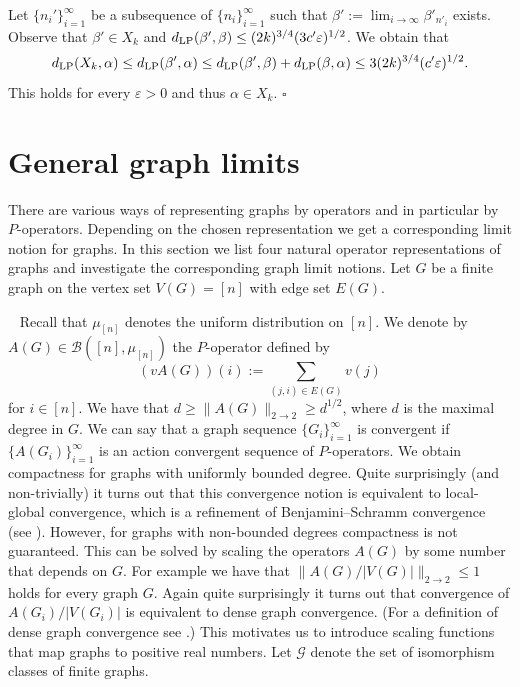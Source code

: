 \documentclass[a4wider]{amsart}
\theoremstyle{definitionbreak}\newtheorem{D}[theorem]{Definition}
\theoremstyle{definitionbreak}\newtheorem*{D*}{Definition}
\begin{document}
Let $\{n_i'\}_{i=1}^\infty$ be a subsequence of $\{n_i\}_{i=1}^\infty$ such that $\beta':=\lim_{i\to\infty}\beta'_{n'_i}$ exists. Observe that $\beta'\in X_k$ and $d_{\rm LP}(\beta',\beta)\leq (2k)^{3/4}(3c'\varepsilon)^{1/2}$. We obtain that $$d_{\rm LP}(X_k,\alpha)\leq d_{\rm LP}(\beta',\alpha)\leq d_{\rm LP}(\beta',\beta)+d_{\rm LP}(\beta,\alpha)\leq 3(2k)^{3/4}(c'\varepsilon)^{1/2}.$$ This holds for every $\varepsilon>0$ and thus $\alpha\in X_k$. \hfill  $\square$






\section{General graph limits}\label{chapgenlim}

\label{general}

There are various ways of representing graphs by operators and in particular by $P$-operators. Depending on the chosen representation we get a corresponding limit notion for graphs. In this section we list four natural operator representations of graphs and investigate the corresponding graph limit notions. Let $G$ be a finite graph on the vertex set $V(G)=[n]$ with edge set $E(G)$. 

~ Recall that $\mu_{[n]}$ denotes the uniform distribution on $[n]$.  We denote by $A(G)\in\mathcal{B}([n],\mu_{[n]})$ the $P$-operator defined by 
$$(vA(G))(i):=\sum_{(j,i)\in E(G)} v(j)$$ for $i\in [n]$. We have that $d\geq\|A(G)\|_{2\to 2}\geq d^{1/2}$, where $d$ is the maximal degree in $G$. We can say that a graph sequence $\{G_i\}_{i=1}^\infty$ is convergent if $\{A(G_i)\}_{i=1}^\infty$ is an action convergent sequence of $P$-operators. We obtain compactness for graphs with uniformly bounded degree. Quite surprisingly (and non-trivially) it turns out that this convergence notion is equivalent to local-global convergence, which is a refinement of Benjamini--Schramm convergence (see \cite{BS, HLSz}). However, for graphs with non-bounded degrees compactness is not guaranteed. This can be solved by scaling the operators $A(G)$ by some number that depends on $G$. For example we have that $\|A(G)/|V(G)|\|_{2\to 2}\leq 1$ holds for every graph $G$. Again quite surprisingly it turns out that convergence of $A(G_i)/|V(G_i)|$ is equivalent to dense graph convergence. (For a definition of dense graph convergence see \cite{LSz}.) This motivates us to introduce scaling functions that map graphs to positive real numbers. Let $\mathcal{G}$ denote the set of isomorphism classes of finite graphs. 
\end{document}
